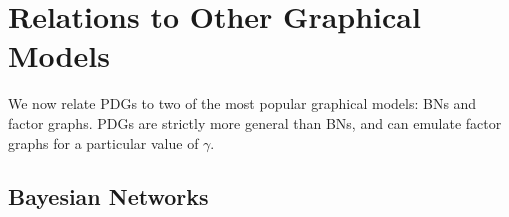 \documentclass{article}
\theoremstyle{plain}
\theoremstyle{definition}
\theoremstyle{remark}
\numberwithin{equation}{section}
\begin{document}



	\section{Relations to Other Graphical  Models}\label{sec:other-graphical-models}
	We now relate PDGs to two of the most popular graphical
        models: BNs and factor graphs. PDGs 
	are strictly more general than BNs, and can emulate factor graphs for a particular value of $\gamma$.
		
	\subsection{Bayesian Networks} \label{sec:bn-convert}
		
\end{document}

